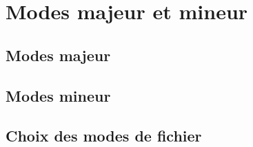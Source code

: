 \chapter{Modes majeur et mineur}\label{chap20}
\section{Modes majeur}\label{chap20sec1}
\section{Modes mineur}\label{chap20sec2}
\section{Choix des modes de fichier}\label{chap20sec3}
